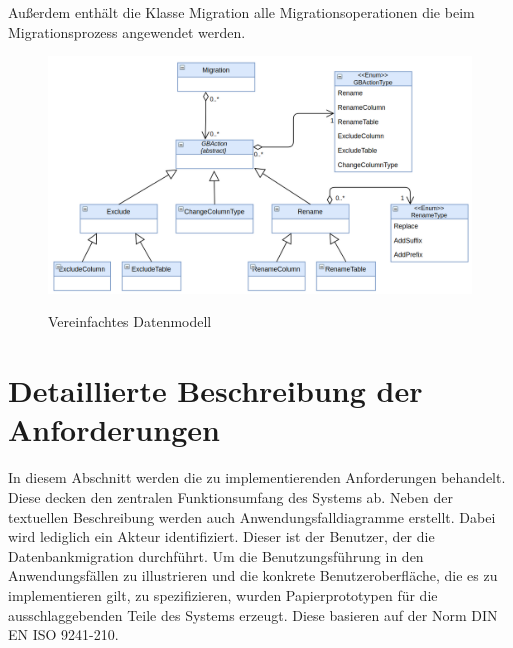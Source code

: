 Außerdem enthält die Klasse Migration alle Migrationsoperationen die beim Migrationsprozess angewendet werden.
\begin{figure}[H]
	\caption{Vereinfachtes Datenmodell}
	\centering
	\includegraphics[width=\textwidth]{images/sichten/abstract-datenmodell}
	\label{img:abstract-datenmodell}
\end{figure}


\section{Detaillierte Beschreibung der Anforderungen}
\label{sec:af}
In diesem Abschnitt werden die zu implementierenden Anforderungen behandelt. Diese decken den zentralen Funktionsumfang des Systems ab.
Neben der textuellen Beschreibung werden auch Anwendungsfalldiagramme erstellt. Dabei wird lediglich ein Akteur identifiziert. Dieser ist der Benutzer, der die Datenbankmigration durchführt. Um die Benutzungsführung in den Anwendungsfällen zu illustrieren und die konkrete Benutzeroberfläche, die es zu implementieren gilt, zu spezifizieren, wurden Papierprototypen für die ausschlaggebenden Teile des Systems erzeugt. Diese basieren auf der Norm DIN EN ISO 9241-210.





